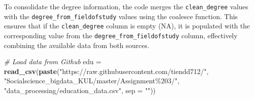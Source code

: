\documentclass[11pt,]{article}
\newenvironment{Shaded}{\begin{snugshade}}{\end{snugshade}}
\newcommand{\AttributeTok}[1]{\textcolor[rgb]{0.13,0.29,0.53}{#1}}
\newcommand{\CommentTok}[1]{\textcolor[rgb]{0.56,0.35,0.01}{\textit{#1}}}
\newcommand{\FunctionTok}[1]{\textcolor[rgb]{0.13,0.29,0.53}{\textbf{#1}}}
\newcommand{\NormalTok}[1]{#1}
\newcommand{\OtherTok}[1]{\textcolor[rgb]{0.56,0.35,0.01}{#1}}
\newcommand{\StringTok}[1]{\textcolor[rgb]{0.31,0.60,0.02}{#1}}
\begin{document}
To consolidate the degree information, the code merges the
\texttt{clean\_degree} values with the
\texttt{degree\_from\_fieldofstudy} values using the coalesce function.
This ensures that if the \texttt{clean\_degree} column is empty (NA), it
is populated with the corresponding value from the
\texttt{degree\_from\_fieldofstudy} column, effectively combining the
available data from both sources.

\begin{Shaded}
\begin{Highlighting}[]
\CommentTok{\# Load data from Github}
\NormalTok{edu }\OtherTok{=} \FunctionTok{read\_csv}\NormalTok{(}\FunctionTok{paste}\NormalTok{(}\StringTok{"https://raw.githubusercontent.com/tiendd712/"}\NormalTok{,}
                      \StringTok{"Socialscience\_bigdata\_KUL/master/Assignment\%203/"}\NormalTok{,}
                      \StringTok{"data\_processing/education\_data.csv"}\NormalTok{, }\AttributeTok{sep =} \StringTok{""}\NormalTok{))}
  

\end{Highlighting}
\end{Shaded}
\end{document}
